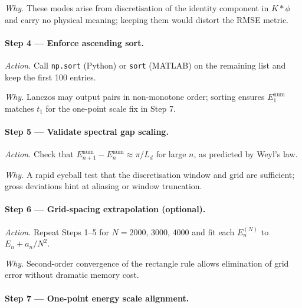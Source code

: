 \documentclass[11pt]{article}
\begin{document}
\emph{Why.}\;  
These modes arise from discretisation of the identity component in
\(K\!\ast\!\phi\) and carry no physical meaning;  
keeping them would distort the RMSE metric.

\vspace{0.4em}
\paragraph{Step 4 — Enforce ascending sort.}

\emph{Action.}\;  
Call \texttt{np.sort} (Python) or \texttt{sort} (MATLAB) on the
remaining list and keep the first 100 entries.

\emph{Why.}\;  
Lanczos may output pairs in non-monotone order;  
sorting ensures \(E_{1}^{\mathrm{num}}\) matches \(t_{1}\) for the
one-point scale fix in Step 7.

\vspace{0.4em}
\paragraph{Step 5 — Validate spectral gap scaling.}

\emph{Action.}\;  
Check that \(E_{n+1}^{\mathrm{num}}-E_{n}^{\mathrm{num}}\approx
\pi/L_{d}\) for large \(n\), as predicted by Weyl’s law.

\emph{Why.}\;  
A rapid eyeball test that the discretisation window and grid are
sufficient; gross deviations hint at aliasing or window truncation.

\vspace{0.4em}
\paragraph{Step 6 — Grid-spacing extrapolation (optional).}

\emph{Action.}\;  
Repeat Steps 1–5 for \(N=2000,\,3000,\,4000\) and fit each
\(E_{n}^{(N)}\) to \(E_{n}+a_{n}/N^{2}\).

\emph{Why.}\;  
Second-order convergence of the rectangle rule allows elimination of
grid error without dramatic memory cost.

\vspace{0.4em}
\paragraph{Step 7 — One-point energy scale alignment.}
\end{document}
